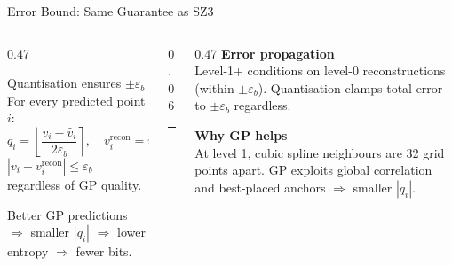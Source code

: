 \documentclass[aspectratio=169, 10pt]{beamer}
\begin{document}
\begin{frame}{Error Bound: Same Guarantee as SZ3}
\vspace{0.2em}
\begin{columns}[T, totalwidth=\textwidth]

  \begin{column}{0.47\textwidth}
    \begin{block}{Quantisation ensures $\pm\varepsilon_b$}
      \footnotesize
      For every predicted point $i$:
      \[
        q_i = \left\lfloor \frac{v_i - \hat{v}_i}{2\varepsilon_b}
              \right\rceil, \quad
        v_i^{\mathrm{recon}} = \hat{v}_i + q_i \cdot 2\varepsilon_b
      \]
      $|v_i - v_i^{\mathrm{recon}}| \le \varepsilon_b$ regardless of
      GP quality.
    \end{block}

    \smallskip
    {\footnotesize Better GP predictions $\Rightarrow$ smaller $|q_i|$
    $\Rightarrow$ lower entropy $\Rightarrow$ fewer bits.}
  \end{column}

  \begin{column}{0.06\textwidth}
    \color{cteal}\rule{1pt}{0.72\textheight}
  \end{column}

  \begin{column}{0.47\textwidth}
    {\footnotesize\bfseries\color{cteal} Error propagation}\\[3pt]
    {\footnotesize Level-1+ conditions on level-0 reconstructions
    (within $\pm\varepsilon_b$). Quantisation clamps total error
    to $\pm\varepsilon_b$ regardless.}

    \medskip
    {\footnotesize\bfseries\color{cteal} Why GP helps}\\[3pt]
    {\footnotesize At level 1, cubic spline neighbours are 32 grid
    points apart. GP exploits global correlation and best-placed
    anchors $\Rightarrow$ smaller $|q_i|$.}
  \end{column}

\end{columns}
\end{frame}
\end{document}
